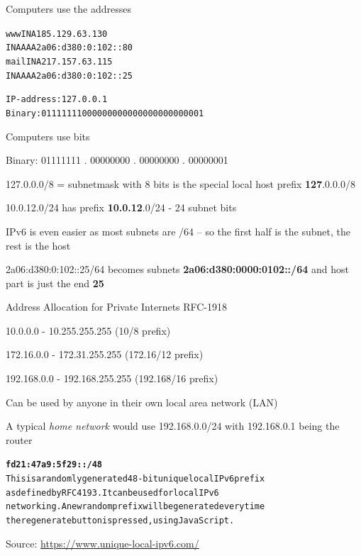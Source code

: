 \documentclass[Screen16to9,17pt]{foils}
\begin{document}
Computers use the addresses

\begin{alltt}
www     IN      A       185.129.63.130
        IN      AAAA    2a06:d380:0:102::80
mail    IN      A       217.157.63.115
        IN      AAAA    2a06:d380:0:102::25
\end{alltt}



\begin{alltt}
IP-address: 127.0.0.1
Binary:	01111111000000000000000000000001
\end{alltt}

\begin{list1}
\item Computers use bits \item Binary:	01111111 . 00000000 . 00000000 . 00000001
\item 127.0.0.0/8 = subnetmask with 8 bits is the special local host prefix \textbf{127}.0.0.0/8
\item 10.0.12.0/24 has prefix \textbf{10.0.12}.0/24 - 24 subnet bits
\vskip 5mm
\item IPv6 is even easier as most subnets are /64 -- so the first half is the subnet, the rest is the host
\item 2a06:d380:0:102::25/64 becomes subnets \textbf{2a06:d380:0000:0102::/64} and host part is just the end \textbf{25}
\end{list1}


Address Allocation for Private Internets RFC-1918
\begin{list2}
\item 10.0.0.0    -  10.255.255.255  (10/8 prefix)
\item 172.16.0.0  -  172.31.255.255  (172.16/12 prefix)
\item 192.168.0.0 -  192.168.255.255 (192.168/16 prefix)
\end{list2}

Can be used by anyone in their own local area network (LAN)

A typical \emph{home network} would use 192.168.0.0/24 with 192.168.0.1 being the router



\begin{alltt}\center\textbf{
fd21:47a9:5f29::/48}\\
This is a randomly generated 48-bit unique local IPv6 prefix
as defined by RFC 4193. It can be used for local IPv6
networking. A new random prefix will be generated every time
the regenerate button is pressed, using JavaScript.
\end{alltt}
Source: \url{https://www.unique-local-ipv6.com/}
\end{document}
